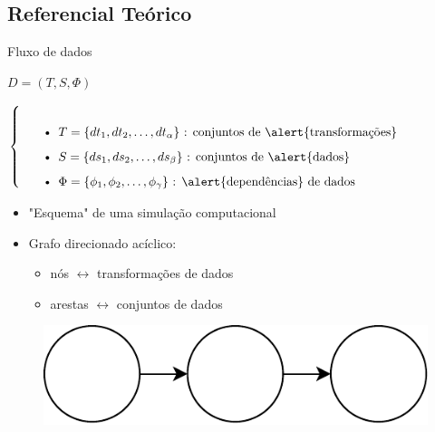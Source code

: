 \documentclass[12pt,compress]{beamer}
\begin{document}
\subsection*{Referencial Teórico}

\begin{frame}[t]{Fluxo de dados}

\centerline{$D = (T, S, \Phi)$}

$\left\{
\begin{tabular}{p{\textwidth}}
\begin{itemize}
    \item \( T = \{dt_1, dt_2, \ldots, dt_{\alpha}\} \) : conjuntos de \alert{transformações}
    \item \( S = \{ds_1, ds_2, \ldots, ds_{\beta}\} \) : conjuntos de \alert{dados}
    \item \( \Phi = \{\phi_1, \phi_2, \ldots, \phi_{\gamma}\} \) : \alert{dependências} de dados
\end{itemize}
\end{tabular}
\right.$

\vfill

\begin{itemize}
\item \alert{"Esquema"} de uma simulação computacional
\item \alert{Grafo} direcionado acíclico:
\begin{itemize}
\item nós $\leftrightarrow$ transformações de dados
\item arestas $\leftrightarrow$ conjuntos de dados
\end{itemize}
\end{itemize}

\begin{figure}
\includegraphics[width=.35\textwidth]{img/graph.pdf}
\end{figure}

\end{frame}

\end{document}
